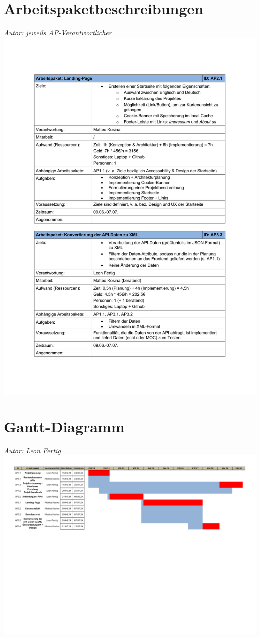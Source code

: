 \documentclass[12pt]{article}
\begin{document}
\section{Arbeitspaketbeschreibungen}
{\it Autor: jeweils AP-Verantwortlicher}
\newline
\includegraphics[width=\textwidth]{Planungsdokumente/graphics/Arbeitspakete.pdf}

\section{Gantt-Diagramm}
{\it Autor: Leon Fertig}
\newline
\includegraphics[width=\textwidth, page=1]{Planungsdokumente/graphics/Gantt_Diagramm.pdf}
\pagebreak
\end{document}
